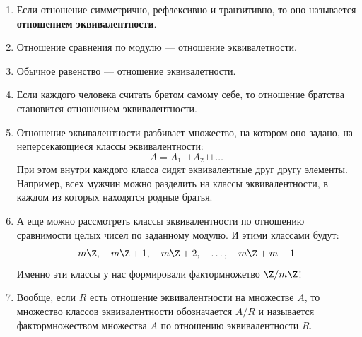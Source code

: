 \begin{enumerate}
\item Если отношение симметрично, рефлексивно и транзитивно, то оно называется \textbf{отношением эквивалентности}.
\item Отношение сравнения по модулю --- отношение эквивалетности.
\item Обычное равенство --- отношение эквивалетности.
\item Если каждого человека считать братом самому себе, то отношение братства становится отношением эквивалентности.
\item Отношение эквивалентности разбивает множество, на котором оно задано, на неперсекающиеся классы эквивалентности:
$$
A = A_1\sqcup A_2\sqcup\dots
$$
При этом внутри каждого класса сидят эквивалентные друг другу элементы. Например, всех мужчин можно разделить на классы эквивалентности, в каждом из которых находятся родные братья.
\item А еще можно рассмотреть классы эквивалентности по отношению сравнимости целых чисел по заданному модулю. И этими классами будут:
$$
m\Z,\quad m\Z+1,\quad m\Z+2,\quad\dots,\quad m\Z+m-1
$$
Именно эти классы у нас формировали фактормножетво $\Z/m\Z$!
\item Вообще, если $R$ есть отношение эквивалентности на множестве $A$, то множество классов эквивалентности обозначается $A/R$ и называется фактормножеством множества $A$ по отношению эквивалентности $R$.
\end{enumerate}


